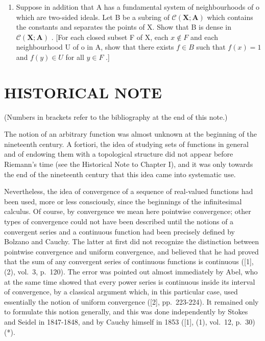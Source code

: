 \begin{enumerate}
\def\labelenumi{\alph{enumi})}
\setcounter{enumi}{1}
\tightlist
\item
  Suppose in addition that A has a fundamental system of neighbourhoods of o which are two-sided ideals. Let B be a subring of \(\mathcal{C}(\mathbf{X};\mathbf{A})\) which contains the constants and separates the points of X. Show that B is dense in \(\mathcal{C}(\mathbf{X};\mathbf{A})\) . {[}For each closed subset F of X, each \(x\notin F\) and each neighbourhood U of o in A, show that there exists \(f\in B\) such that \(f(x)=1\) and \(f(y)\in U\) for all \(y\in F\) .{]}
\end{enumerate}

\section*{HISTORICAL NOTE}
{}

(Numbers in brackets refer to the bibliography at the end of this note.)

The notion of an arbitrary function was almost unknown at the beginning of the nineteenth century. A fortiori, the idea of studying sets of functions in general and of endowing them with a topological structure did not appear before Riemann's time (see the Historical Note to Chapter I), and it was only towards the end of the nineteenth century that this idea came into systematic use.

Nevertheless, the idea of convergence of a sequence of real-valued functions had been used, more or less consciously, since the beginnings of the infinitesimal calculus. Of course, by convergence we mean here pointwise convergence; other types of convergence could not have been described until the notions of a convergent series and a continuous function had been precisely defined by Bolzano and Cauchy. The latter at first did not recognize the distinction between pointwise convergence and uniform convergence, and believed that he had proved that the sum of any convergent series of continuous functions is continuous ({[}1{]}, (2), vol.~3, p.~120). The error was pointed out almost immediately by Abel, who at the same time showed that every power series is continuous inside its interval of convergence, by a classical argument which, in this particular case, used essentially the notion of uniform convergence ({[}2{]}, pp.~223-224). It remained only to formulate this notion generally, and this was done independently by Stokes and Seidel in 1847-1848, and by Cauchy himself in 1853 ({[}1{]}, (1), vol.~12, p.~30) (*).

